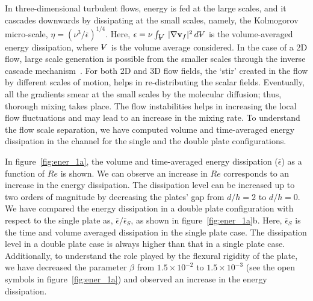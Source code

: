\documentclass[aps,pre,twocolumn,aps,longbibliography]{revtex4-1}
\newcommand{\volume}{{\ooalign{\hfil$V$\hfil\cr\kern0.08em--\hfil\cr}}}
\begin{document}
	
	In three-dimensional turbulent flows, energy is fed at the large scales, and it cascades downwards by dissipating at the small scales, namely, the Kolmogorov micro-scale, $\eta=(\nu^3/\overline{\epsilon})^{1/4}$. Here, $\epsilon= {\nu}\int_{\volume}\, |\nabla\mathbf{v}_f|^2\, d\volume$ is the volume-averaged energy dissipation, where $\volume$ is the volume average considered. In the case of a 2D flow, large scale generation is possible from the smaller scales through the inverse cascade mechanism~\citep{Boffetta2012, Mishra2015}. For both 2D and 3D flow fields, the `stir' created in the flow by different scales of motion, helps in re-distributing the scalar fields. Eventually, all the gradients smear at the small scales by the molecular diffusion; thus, thorough mixing takes place. The flow instabilities helps in increasing the local flow fluctuations and may lead to an increase in the mixing rate. To understand the flow scale separation, we have computed volume and time-averaged energy dissipation in the channel for the single and the double plate configurations. 
	
	
	
	In figure~\ref{fig:ener_1a}, the volume and time-averaged energy dissipation ($\overline{\epsilon}$) as a function of $Re$ is shown. We can observe an increase in $Re$ corresponds to an increase in the energy dissipation. The dissipation level can be increased up to two orders of magnitude by decreasing the plates' gap from $d/h=2$ to $d/h=0$. We have compared the energy dissipation in a double plate configuration with respect to the single plate as, ${\overline{\epsilon}/\overline{\epsilon}_S}$, as shown in figure~\ref{fig:ener_1a}b. Here, $\overline{\epsilon}_S$ is the time and volume averaged dissipation in the single plate case. The dissipation level in a double plate case is always higher than that in a single plate case. Additionally, to understand the role played by the flexural rigidity of the plate, we have decreased the parameter $\beta$ from $1.5 \times 10^{-2}$ to $1.5\times 10^{-3}$ (see the open symbols in figure~\ref{fig:ener_1a}) and observed an increase in the energy dissipation.
	
	
	
\end{document}
